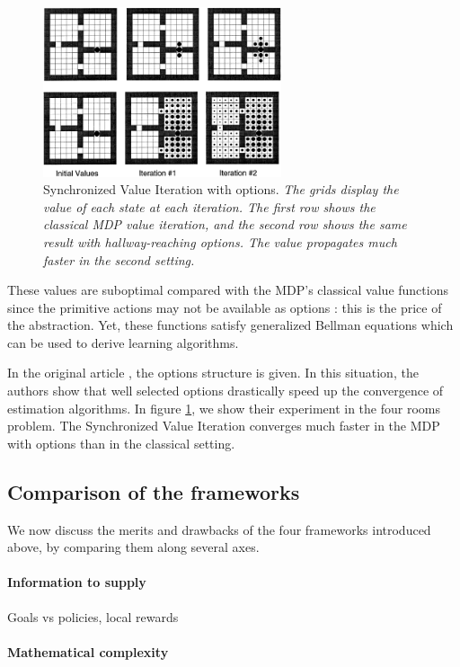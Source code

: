 \documentclass{article}
\begin{document}
\begin{figure}
    \centering
    \includegraphics[width=7cm]{images/SVI_options.png}
    \caption{Synchronized Value Iteration with options. \small \it The grids display the value of each state at each iteration. The first row shows the classical MDP value iteration, and the second row shows the same result with hallway-reaching options. The value propagates much faster in the second setting.}
    \label{fig:svi}
\end{figure}

These values are suboptimal compared with the MDP's classical value functions since the primitive actions may not be available as options : this is the price of the abstraction. Yet, these functions satisfy generalized Bellman equations which can be used to derive learning algorithms.

In the original article \cite{sutton_between_1999}, the options structure is given. In this situation, the authors show that well selected options drastically speed up the convergence of estimation algorithms. In figure \ref{fig:svi}, we show their experiment in the four rooms problem. The Synchronized Value Iteration converges much faster in the MDP with options than in the classical setting.

\subsection{Comparison of the frameworks}

We now discuss the merits and drawbacks of the four frameworks introduced above, by comparing them along several axes.

\paragraph{Information to supply}

Goals vs policies, local rewards

\paragraph{Mathematical complexity}
\end{document}
